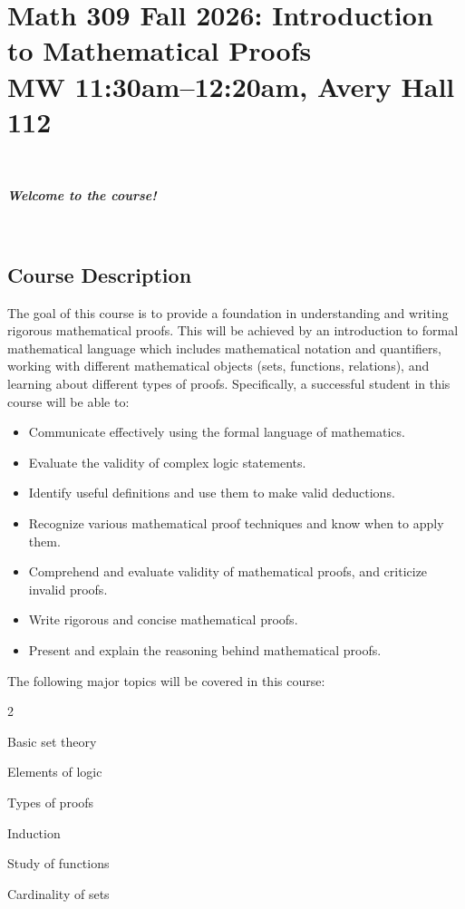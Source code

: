\documentclass[12pt]{amsart}
\newcommand{\showsol}[1]{\def\displaysol{#1}}
\begin{document}
\showsol{0}
	
	\thispagestyle{empty}
	
	\section*{{\large Math 309 Fall 2026: Introduction to Mathematical Proofs}\\ MW 11:30am--12:20am, Avery Hall 112}
	
	\
	
	\begin{center}{ \textit{\textbf{Welcome to the course!}}}\end{center}
	
	\
	
		\subsection*{Course Description} The goal of this course is to provide a foundation in understanding and writing rigorous mathematical proofs. This will be achieved by an introduction to formal mathematical language which includes mathematical notation and quantifiers, working with different mathematical objects (sets, functions, relations), and learning about different types of proofs. Specifically, a successful student in this course will be able to:

\begin{itemize}
	\item Communicate effectively using the formal language of mathematics.
	\item Evaluate the validity of complex logic statements.
	\item Identify useful definitions and use them to make valid deductions.
	\item Recognize various mathematical proof techniques and know when to apply them.
	\item Comprehend and evaluate validity of mathematical proofs, and criticize invalid proofs.
	\item Write rigorous and concise mathematical proofs.
	\item Present and explain the reasoning behind mathematical proofs.
\end{itemize}
The following major topics will be covered in this course:
\vspace{-4mm}
\begin{itemize}
\begin{multicols}{2}
	\item Basic set theory
	\item Elements of logic
	\item Types of proofs
	\item Induction
	\item Study of functions
	\item Cardinality of sets
\end{multicols}
\end{itemize}
\end{document}
